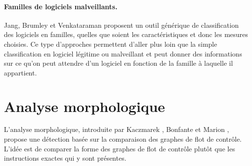 \paragraph{Familles de logiciels malveillants.}
Jang, Brumley et Venkataraman \cite{JBV11} proposent un outil générique de classification des logiciels en familles, quelles que soient les caractéristiques et donc les mesures choisies. Ce type d'approches permettent d'aller plus loin que la simple classification en logiciel légitime ou malveillant et peut donner des informations sur ce qu'on peut attendre d'un logiciel en fonction de la famille à laquelle il appartient.

\section{Analyse morphologique}
L'analyse morphologique, introduite par Kaczmarek \cite{Kacz08}, Bonfante et Marion \cite{BKM08}, propose une détection 
basée sur la comparaison des graphes de flot de contrôle. L'idée est de comparer la forme des graphes de flot de contrôle plutôt que les instructions exactes qui y sont présentes.

% 
% 
% 

